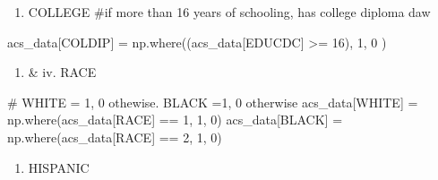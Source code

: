\documentclass[
  11pt,
  letterpaper,
  DIV=11,
  numbers=noendperiod]{scrartcl}
\newenvironment{Shaded}{\begin{snugshade}}{\end{snugshade}}
\newcommand{\CommentTok}[1]{\textcolor[rgb]{0.37,0.37,0.37}{#1}}
\newcommand{\DecValTok}[1]{\textcolor[rgb]{0.68,0.00,0.00}{#1}}
\newcommand{\NormalTok}[1]{\textcolor[rgb]{0.00,0.23,0.31}{#1}}
\newcommand{\OperatorTok}[1]{\textcolor[rgb]{0.37,0.37,0.37}{#1}}
\newcommand{\StringTok}[1]{\textcolor[rgb]{0.13,0.47,0.30}{#1}}
\providecommand{\tightlist}{%
  \setlength{\itemsep}{0pt}\setlength{\parskip}{0pt}}\usepackage{longtable,booktabs,array}
\begin{document}
\begin{enumerate}
\def\labelenumi{\roman{enumi}.}
\setcounter{enumi}{1}
\tightlist
\item
  COLLEGE \#if more than 16 years of schooling, has college diploma daw
\end{enumerate}

\begin{Shaded}
\begin{Highlighting}[]
\NormalTok{acs\_data[}\StringTok{\textquotesingle{}COLDIP\textquotesingle{}}\NormalTok{] }\OperatorTok{=}\NormalTok{ np.where((acs\_data[}\StringTok{\textquotesingle{}EDUCDC\textquotesingle{}}\NormalTok{] }\OperatorTok{\textgreater{}=} \DecValTok{16}\NormalTok{),}
    \DecValTok{1}\NormalTok{,}
    \DecValTok{0}
\NormalTok{)}
\end{Highlighting}
\end{Shaded}

\begin{enumerate}
\def\labelenumi{\roman{enumi}.}
\setcounter{enumi}{2}
\tightlist
\item
  \& iv. RACE
\end{enumerate}

\begin{Shaded}
\begin{Highlighting}[]
\CommentTok{\# WHITE = 1, 0 othewise. BLACK =1, 0 otherwise}
\NormalTok{acs\_data[}\StringTok{\textquotesingle{}WHITE\textquotesingle{}}\NormalTok{] }\OperatorTok{=}\NormalTok{ np.where(acs\_data[}\StringTok{\textquotesingle{}RACE\textquotesingle{}}\NormalTok{] }\OperatorTok{==} \DecValTok{1}\NormalTok{, }\DecValTok{1}\NormalTok{, }\DecValTok{0}\NormalTok{)}
\NormalTok{acs\_data[}\StringTok{\textquotesingle{}BLACK\textquotesingle{}}\NormalTok{] }\OperatorTok{=}\NormalTok{ np.where(acs\_data[}\StringTok{\textquotesingle{}RACE\textquotesingle{}}\NormalTok{] }\OperatorTok{==} \DecValTok{2}\NormalTok{, }\DecValTok{1}\NormalTok{, }\DecValTok{0}\NormalTok{)}
\end{Highlighting}
\end{Shaded}

\begin{enumerate}
\def\labelenumi{\alph{enumi}.}
\setcounter{enumi}{21}
\tightlist
\item
  HISPANIC
\end{enumerate}
\end{document}
